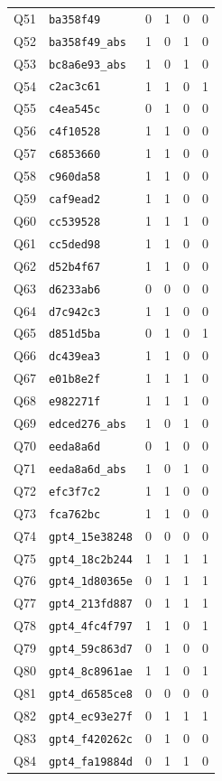 \begin{longtable}{@{}clcccc@{}}
Q51 & \texttt{ba358f49} & 0 & 1 & 0 & 0 \\
Q52 & \texttt{ba358f49\_abs} & 1 & 0 & 1 & 0 \\
Q53 & \texttt{bc8a6e93\_abs} & 1 & 0 & 1 & 0 \\
Q54 & \texttt{c2ac3c61} & 1 & 1 & 0 & 1 \\
Q55 & \texttt{c4ea545c} & 0 & 1 & 0 & 0 \\
Q56 & \texttt{c4f10528} & 1 & 1 & 0 & 0 \\
Q57 & \texttt{c6853660} & 1 & 1 & 0 & 0 \\
Q58 & \texttt{c960da58} & 1 & 1 & 0 & 0 \\
Q59 & \texttt{caf9ead2} & 1 & 1 & 0 & 0 \\
Q60 & \texttt{cc539528} & 1 & 1 & 1 & 0 \\
Q61 & \texttt{cc5ded98} & 1 & 1 & 0 & 0 \\
Q62 & \texttt{d52b4f67} & 1 & 1 & 0 & 0 \\
Q63 & \texttt{d6233ab6} & 0 & 0 & 0 & 0 \\
Q64 & \texttt{d7c942c3} & 1 & 1 & 0 & 0 \\
Q65 & \texttt{d851d5ba} & 0 & 1 & 0 & 1 \\
Q66 & \texttt{dc439ea3} & 1 & 1 & 0 & 0 \\
Q67 & \texttt{e01b8e2f} & 1 & 1 & 1 & 0 \\
Q68 & \texttt{e982271f} & 1 & 1 & 1 & 0 \\
Q69 & \texttt{edced276\_abs} & 1 & 0 & 1 & 0 \\
Q70 & \texttt{eeda8a6d} & 0 & 1 & 0 & 0 \\
Q71 & \texttt{eeda8a6d\_abs} & 1 & 0 & 1 & 0 \\
Q72 & \texttt{efc3f7c2} & 1 & 1 & 0 & 0 \\
Q73 & \texttt{fca762bc} & 1 & 1 & 0 & 0 \\
Q74 & \texttt{gpt4\_15e38248} & 0 & 0 & 0 & 0 \\
Q75 & \texttt{gpt4\_18c2b244} & 1 & 1 & 1 & 1 \\
Q76 & \texttt{gpt4\_1d80365e} & 0 & 1 & 1 & 1 \\
Q77 & \texttt{gpt4\_213fd887} & 0 & 1 & 1 & 1 \\
Q78 & \texttt{gpt4\_4fc4f797} & 1 & 1 & 0 & 1 \\
Q79 & \texttt{gpt4\_59c863d7} & 0 & 1 & 0 & 0 \\
Q80 & \texttt{gpt4\_8c8961ae} & 1 & 1 & 0 & 1 \\
Q81 & \texttt{gpt4\_d6585ce8} & 0 & 0 & 0 & 0 \\
Q82 & \texttt{gpt4\_ec93e27f} & 0 & 1 & 1 & 1 \\
Q83 & \texttt{gpt4\_f420262c} & 0 & 1 & 0 & 0 \\
Q84 & \texttt{gpt4\_fa19884d} & 0 & 1 & 1 & 0 \\
\end{longtable}

